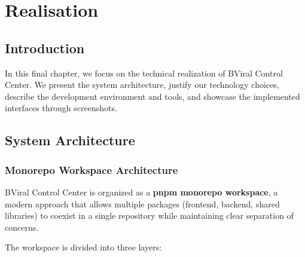 \chapter{Realisation}

\section*{Introduction}
In this final chapter, we focus on the technical realization of BViral Control Center. We present the system architecture, justify our technology choices, describe the development environment and tools, and showcase the implemented interfaces through screenshots.

\section{System Architecture}

\subsection{Monorepo Workspace Architecture}

BViral Control Center is organized as a \textbf{pnpm monorepo workspace}, a modern approach that allows multiple packages (frontend, backend, shared libraries) to coexist in a single repository while maintaining clear separation of concerns.


The workspace is divided into three layers:

